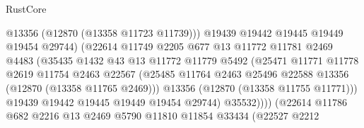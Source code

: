 \begin{lexlean}{RustCore}
\begin{coremodule}
                                      @13356
                                      (@12870 (@13358 @11723 @11739)))
                                    @19439
                                    @19442
                                    @19445
                                    @19449
                                    @19454
                                    @29744)
                                  (@22614
                                    @11749
                                    @2205
                                    @677
                                    @13
                                    @11772
                                    @11781
                                    @2469
                                    @4483
                                    (@35435
                                      @1432
                                      @43
                                      @13
                                      @11772
                                      @11779
                                      @5492
                                      (@25471
                                        @11771
                                        @11778
                                        @2619
                                        @11754
                                        @2463
                                        @22567
                                        (@25485
                                          @11764
                                          @2463
                                          @25496
                                          @22588
                                          @13356
                                          (@12870 (@13358 @11765 @2469)))
                                        @13356
                                        (@12870 (@13358 @11755 @11771)))
                                      @19439
                                      @19442
                                      @19445
                                      @19449
                                      @19454
                                      @29744)
                                    @35532))))
                            (@22614
                              @11786
                              @682
                              @2216
                              @13
                              @2469
                              @5790
                              @11810
                              @11854
                              @33434
                              (@22527
                                @2212

\end{coremodule}
\end{lexlean}
